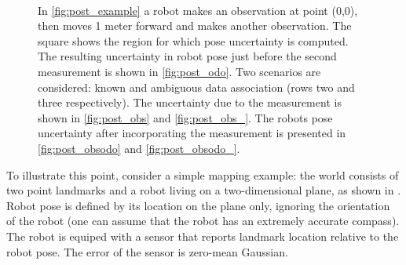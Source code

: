 \begin{figure}
\begin{center}
{\label{fig:post_obsodo}
}\\
\quad\space
{}
\end{center}
\caption[Robot pose uncertainty, example]{In \ref{fig:post_example} a
  robot makes an observation at point (0,0), then moves 1 meter
  forward and makes another observation. The square shows the region
  for which pose uncertainty is computed. The resulting uncertainty
  in robot pose just before the second measurement is shown in
  \ref{fig:post_odo}. Two scenarios are considered: known and
  ambiguous data association (rows two and three respectively).  The
  uncertainty due to the measurement is shown in \ref{fig:post_obs}
  and \ref{fig:post_obs_}. The robots pose uncertainty after
  incorporating the measurement is presented in \ref{fig:post_obsodo}
  and \ref{fig:post_obsodo_}.}\label{fig:post_all}
\end{figure}

To illustrate this point, consider a simple mapping example: the world
consists of two point landmarks and a robot living on a
two-dimensional plane, as shown in . Robot
pose is defined by its location on the plane only, ignoring the
orientation of the robot (one can assume that the robot has an
extremely accurate compass). The robot is equiped with a sensor that
reports landmark location relative to the robot pose. The error of the
sensor is zero-mean Gaussian.

